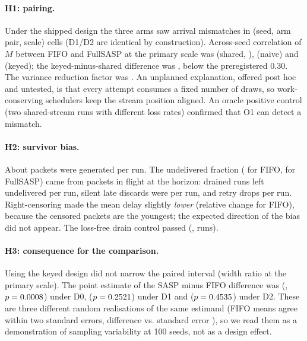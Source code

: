 \documentclass[11pt]{article}
\begin{document}
\paragraph{H1: pairing.} Under the shipped design the three arms saw arrival mismatches in \OneMismatchShared{} (seed, arm pair, scale) cells (D1/D2 are identical by construction). Across-seed correlation of $M$ between FIFO and FullSASP at the primary scale was \RhoTwoShared{} (shared, \RhoTwoSharedCI), \RhoTwoNaive{} (naive) and \RhoTwoKeyed{} (keyed); the keyed-minus-shared difference was \DeltaRhoTwo{} \DeltaRhoTwoCI, below the preregistered 0.30. The variance reduction factor was \VRFTwo{} \VRFTwoCI. An unplanned explanation, offered post hoc and untested, is that every attempt consumes a fixed number of draws, so work-conserving schedulers keep the stream position aligned. An oracle positive control (two shared-stream runs with different loss rates) confirmed that O1 can detect a mismatch.

\paragraph{H2: survivor bias.} About \GenPerRun{} packets were generated per run. The undelivered fraction (\UndelFracFIFO{} for FIFO, \UndelFracFullSASP{} for FullSASP) came from packets in flight at the horizon: drained runs left \DrainUndelFerOne{} undelivered per run, silent late discards were \LateDiscards{} per run, and retry drops \RetryDrops{} per run. Right-censoring made the mean delay slightly \emph{lower} (relative change \UnderUFIFO{} for FIFO), because the censored packets are the youngest; the expected direction of the bias did not appear. The loss-free drain control passed (\DrainValid{}, \DrainRows{} runs).

\paragraph{H3: consequence for the comparison.} Using the keyed design did not narrow the paired interval (width ratio \WidthRatioTwo{} at the primary scale). The point estimate of the SASP minus FIFO difference was \MeanDTwoShared{} (\MeanDTwoSharedCI, $p=0.0008$) under D0, \MeanDTwoNaive{} ($p=0.2521$) under D1 and \MeanDTwoKeyed{} ($p=0.4535$) under D2. These are three different random realisations of the same estimand (FIFO means agree within two standard errors, difference \PropCDiffTwo{} vs. standard error \PropCSETwo), so we read them as a demonstration of sampling variability at 100 seeds, not as a design effect.
\end{document}

